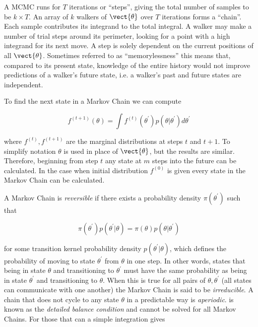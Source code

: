 A MCMC runs for $T$ iterations or ``steps'', giving the total number of samples to be $k \times T$.    An array of $k$ walkers of
$\vect{\theta}$ over $T$ iterations forms a ``chain''.  Each sample contributes its
integrand to the total integral.  A walker may make a number of trial steps around its perimeter, looking for a point with a high
integrand for its next move.  A step is solely dependent on the current positions of all $\vect{\theta}$.  Sometimes referred to as
``memorylessness'' this means that, compared to its present state, knowledge of the entire history would not improve predictions of a
walker's future state, i.e. a walker's past and future states are independent.

To find the next state in a Markov Chain we can compute

\begin{equation}
f^{(t + 1)} (\theta) = \int f^{(t)} (\theta^{\prime}) p(\theta|\theta^{\prime}) d\theta^{\prime}
\label{eq:er_nr_calibrations_parameter_determ_mcmc_marginal}
\end{equation}

\noindent where $f^{(t)}, f^{(t + 1)}$ are the marginal distributions at steps $t$ and $t + 1$.  To simplify notation $\theta$
is used in place of $\vect{\theta}$, but the results are similar.  Therefore, beginning from step $t$ any state
at $m$ steps into the future can be calculated.  In the case when initial distribution $f^{(0)}$ is given every state in the Markov Chain can
be calculated.

A Markov Chain is \textit{reversible} if there exists a probability density $\pi (\theta^{\prime})$ such that

\begin{equation}
\pi (\theta^{\prime}) p(\theta^{\prime}|\theta) = \pi (\theta) p(\theta|\theta^{\prime})
\label{eq:er_nr_calibrations_parameter_determ_mcmc_detailed_balance}
\end{equation}

\noindent for some transition kernel probability density $p(\theta^{\prime}|\theta)$, which defines the probability of
moving to state $\theta^{\prime}$ from $\theta$ in one step.  In other words, 
 states that being in state $\theta$ and transitioning to
$\theta^{\prime}$ must have the same probability as being in state $\theta^{\prime}$ and transitioning to 
$\theta$.  When
this is true for all pairs of $\theta, \theta^{\prime}$ (all states can communicate with one another) the Markov Chain
is said to be \textit{irreducible}.  A chain that does not cycle to any state $\theta$ in a predictable way is
\textit{aperiodic}.  
is known as the \textit{detailed balance condition} and cannot be solved for all Markov Chains.  For those that can a simple integration
gives


